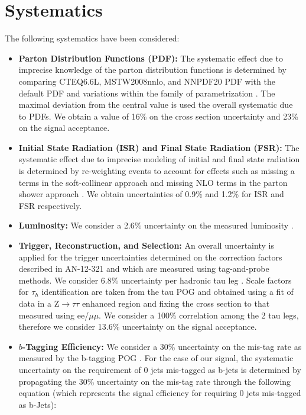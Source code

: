 \clearpage 
\section{Systematics}
\label{sec:systematics}

The following systematics have been considered:

\begin{itemize}
  \item \textbf{Parton Distribution Functions (PDF):} The systematic effect due to imprecise knowledge of the parton 
distribution functions is determined by comparing CTEQ6.6L, MSTW2008nnlo, and NNPDF20 PDF with the default PDF and 
variations within the family of parametrization \cite{CTEQ}. The maximal deviation from the central value is used the overall 
systematic due to PDFs. We obtain a value of 16\% on the cross section uncertainty and 23\% on the signal acceptance.

  \item \textbf{Initial State Radiation (ISR) and Final State Radiation (FSR):} The systematic effect due to imprecise 
modeling of initial and final state radiation is determined by re-weighting events to account for effects such as 
missing a terms in the soft-collinear approach \cite{softCollinear} and missing NLO terms in the parton shower approach \cite{partonShower}. We 
obtain uncertainties of 0.9\% and 1.2\% for ISR and FSR respectively.

  \item \textbf{Luminosity:} We consider a 2.6\% uncertainty on the measured luminosity \cite{REFLUMI}.
  \item \textbf{Trigger, Reconstruction, and Selection:} 
  An overall uncertainty is applied for the trigger uncertainties determined on the
  correction factors described in AN-12-321 and which are measured using tag-and-probe methods. 
  We consider 6.8\% uncertainty per hadronic tau leg \cite{CMS-PAS-TAU-11-001}.
  Scale factors for $\tau_{h}$ identification are taken from the tau POG and obtained using a fit of data in a Z$\to\tau\tau$ enhanced region and fixing the cross section to that measured using ee/$\mu\mu$. We consider a 100\% correlation among the 2 tau legs, therefore we consider 13.6\% uncertainty on the signal acceptance.

  \item \textbf{$b$-Tagging Efficiency:} We consider a 30\% uncertainty on the mis-tag rate as measured by the 
b-tagging POG \cite{CMS_PAS_BTV_11-001}. For the case of our signal, the systematic 
uncertainty on the requirement of 0 jets mis-tagged as b-jets is determined by propagating the 30\% uncertainty on the 
mis-tag rate through the following equation (which represents the signal efficiency for requiring 0 
jets mis-tagged as b-Jets):


\end{itemize}
